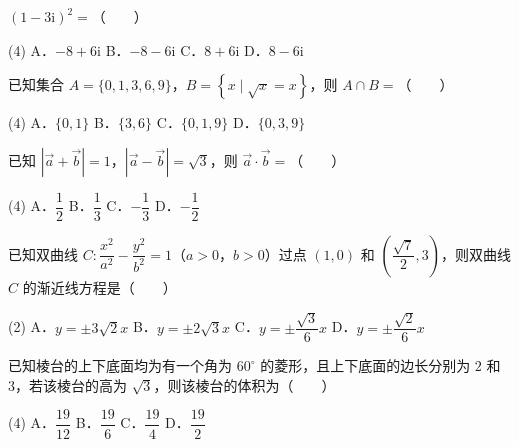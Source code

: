 \begin{question}
$(1-3\mathrm{i})^2=$\mbox{（　　）}

\begin{gkopts}(4)
\task A．$-8+6\mathrm{i}$
\task B．$-8-6\mathrm{i}$
\task C．$8+6\mathrm{i}$
\task D．$8-6\mathrm{i}$
\end{gkopts}

\end{question}
\begin{question}
已知集合 $A=\{0,1,3,6,9\}$，$B=\left\{x\mid\sqrt{x}=x\right\}$，则 $A\cap B=$\mbox{（　　）}

\begin{gkopts}(4)
\task A．$\{0,1\}$
\task B．$\{3,6\}$
\task C．$\{0,1,9\}$
\task D．$\{0,3,9\}$
\end{gkopts}

\end{question}
\begin{question}
已知 $\left|\vec{a}+\vec{b}\right|=1$，$\left|\vec{a}-\vec{b}\right|=\sqrt{3}$，则 $\vec{a}\cdot\vec{b}=$\mbox{（　　）}

\begin{gkopts}(4)
\task A．$\dfrac{1}{2}$
\task B．$\dfrac{1}{3}$
\task C．$-\dfrac{1}{3}$
\task D．$-\dfrac{1}{2}$
\end{gkopts}

\end{question}
\begin{question}
已知双曲线 $C:\dfrac{x^2}{a^2}-\dfrac{y^2}{b^2}=1$（$a>0$，$b>0$）过点 $(1,0)$ 和 $\left(\dfrac{\sqrt{7}}{2},3\right)$，则双曲线 $C$ 的渐近线方程是\mbox{（　　）}

\begin{gkopts}(2)
\task A．$y=\pm3\sqrt{2}x$
\task B．$y=\pm2\sqrt{3}x$
\task C．$y=\pm\dfrac{\sqrt{3}}{6}x$
\task D．$y=\pm\dfrac{\sqrt{2}}{6}x$
\end{gkopts}

\end{question}
\begin{question}
已知棱台的上下底面均为有一个角为 $60^\circ$ 的菱形，且上下底面的边长分别为 $2$ 和 $3$，若该棱台的高为 $\sqrt{3}$，则该棱台的体积为\mbox{（　　）}

\begin{gkopts}(4)
\task A．$\dfrac{19}{12}$
\task B．$\dfrac{19}{6}$
\task C．$\dfrac{19}{4}$
\task D．$\dfrac{19}{2}$
\end{gkopts}

\end{question}
